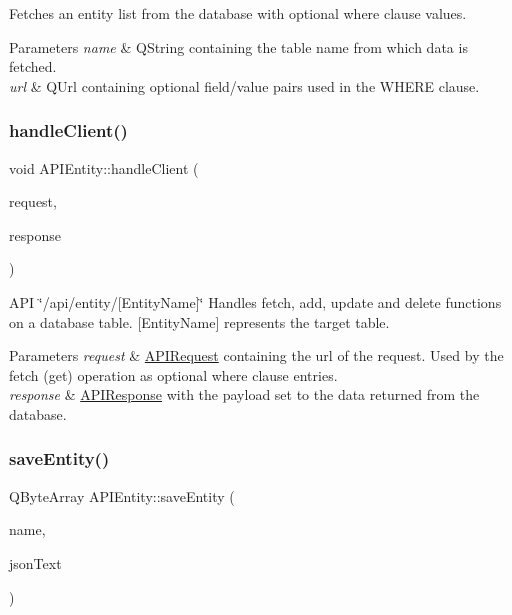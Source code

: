 Fetches an entity list from the database with optional where clause values. 
\begin{DoxyParams}{Parameters}
{\em name} & Q\+String containing the table name from which data is fetched. \\
\hline
{\em url} & Q\+Url containing optional field/value pairs used in the W\+H\+E\+RE clause. \\
\hline
\end{DoxyParams}
\mbox{\label{class_a_p_i_entity_a66ea6b2523afbb3acebaadf3aea1ec6c}} 
\subsubsection{\texorpdfstring{handle\+Client()}{handleClient()}}
{\footnotesize\ttfamily void A\+P\+I\+Entity\+::handle\+Client (\begin{DoxyParamCaption}\item[{const \hyperlink{class_a_p_i_request}{A\+P\+I\+Request} \&}]{request,  }\item[{\hyperlink{class_a_p_i_response}{A\+P\+I\+Response} $\ast$}]{response }\end{DoxyParamCaption})}

A\+PI \char`\"{}/api/entity/\mbox{[}\+Entity\+Name\mbox{]}\char`\"{} Handles fetch, add, update and delete functions on a database table. \mbox{[}Entity\+Name\mbox{]} represents the target table. 
\begin{DoxyParams}{Parameters}
{\em request} & \hyperlink{class_a_p_i_request}{A\+P\+I\+Request} containing the url of the request. Used by the fetch (get) operation as optional where clause entries. \\
\hline
{\em response} & \hyperlink{class_a_p_i_response}{A\+P\+I\+Response} with the payload set to the data returned from the database. \\
\hline
\end{DoxyParams}
\mbox{\label{class_a_p_i_entity_a5f2de518701f362000bb6eb341fbf95b}} 
\subsubsection{\texorpdfstring{save\+Entity()}{saveEntity()}}
{\footnotesize\ttfamily Q\+Byte\+Array A\+P\+I\+Entity\+::save\+Entity (\begin{DoxyParamCaption}\item[{const Q\+String \&}]{name,  }\item[{const Q\+String \&}]{json\+Text }\end{DoxyParamCaption})}

